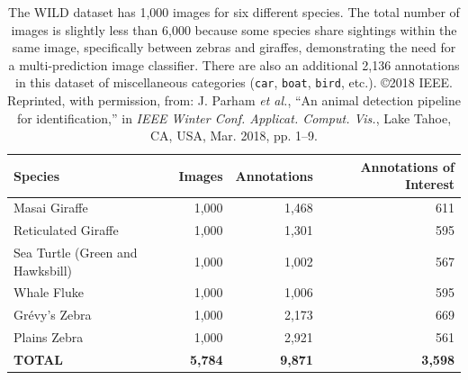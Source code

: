 \begin{table}[!t]
    \caption{The WILD dataset has 1,000 images for six different species.  The total number of images is slightly less than 6,000 because some species share sightings within the same image, specifically between zebras and giraffes, demonstrating the need for a multi-prediction image classifier.  There are also an additional 2,136 annotations in this dataset of miscellaneous categories (\texttt{car}, \texttt{boat}, \texttt{bird}, etc.).  \copyright 2018 IEEE. Reprinted, with permission, from: J. Parham \textit{et al.}, ``An animal detection pipeline for identification,'' in \textit{IEEE Winter Conf. Applicat. Comput. Vis.}, Lake Tahoe, CA, USA, Mar. 2018, pp. 1–9.}
    \label{table:dataset}
    \begin{center}
        \begin{tabular}{| l | r | r | r |}
            \hline
            \textbf{Species}                 & \textbf{Images} & \textbf{Annotations} & \textbf{Annotations of Interest} \\
            \hline
            Masai Giraffe                    & 1,000           & 1,468                & 611                              \\
            \hline
            Reticulated Giraffe              & 1,000           & 1,301                & 595                              \\
            \hline
            Sea Turtle (Green and Hawksbill) & 1,000           & 1,002                & 567                              \\
            \hline
            Whale Fluke                      & 1,000           & 1,006                & 595                              \\
            \hline
            Gr\'evy's Zebra                  & 1,000           & 2,173                & 669                              \\
            \hline
            Plains Zebra                     & 1,000           & 2,921                & 561                              \\
            \hline
            \textbf{TOTAL}                   & \textbf{5,784}  & \textbf{9,871}       & \textbf{3,598}                   \\
            \hline
        \end{tabular}
    \end{center}
\end{table}

